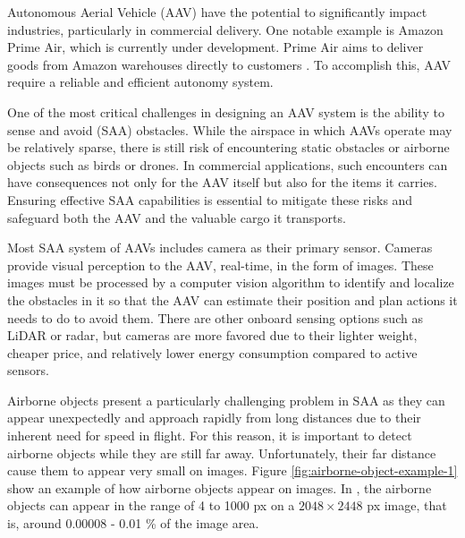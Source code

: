     Autonomous Aerial Vehicle (AAV) have the potential to significantly impact 
    industries, particularly in commercial delivery. One notable example is Amazon 
    Prime Air, which is currently under development. Prime Air aims to deliver 
    goods from Amazon warehouses directly to customers \parencite{prime_air}. 
    To accomplish this, AAV require a reliable and efficient autonomy system.
 
    One of the most critical challenges in designing an AAV system is the 
    ability to sense and avoid (SAA) obstacles. While the airspace in which 
    AAVs operate may be relatively sparse, there is still risk of encountering 
    static obstacles or airborne objects such as birds or drones. In commercial 
    applications, such encounters can have consequences not only for the AAV 
    itself but also for the items it carries.  Ensuring effective SAA 
    capabilities is essential to mitigate these risks and safeguard both the AAV 
    and the valuable cargo it transports.


    Most SAA system of AAVs includes camera as their primary sensor.
    Cameras provide visual perception to the AAV, real-time, in the form of images. 
    These images must be processed by a computer vision algorithm to identify
    and localize the obstacles in it so that the AAV can estimate their 
    position and plan actions it needs to do to avoid them.
    There are other onboard sensing options such as LiDAR or radar, but cameras
    are more favored due to their lighter weight, cheaper price, 
    and relatively lower energy consumption compared to active sensors. 

    Airborne objects present a particularly challenging problem in SAA as they can 
    appear unexpectedly and approach rapidly from long distances due to their 
    inherent need for speed in flight. For this reason, it is important to detect airborne
    objects while they are still far away. Unfortunately, their far distance cause them 
    to appear very small on images. Figure \ref{fig:airborne-object-example-1} show an
    example of how airborne objects appear on images. In \textcite{aot_docs}, the airborne 
    objects can appear in the range of 4 to 1000 px on a $2048 \times 2448$ px image, that is,
    around 0.00008 - 0.01 \% of the image area.


